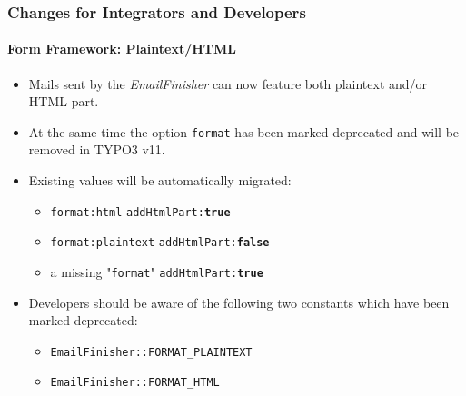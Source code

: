 
\begin{frame}[fragile]
	\frametitle{Changes for Integrators and Developers}
	\framesubtitle{Form Framework: Plaintext/HTML}

	\begin{itemize}
		\item Mails sent by the \textit{EmailFinisher} can now feature both plaintext and/or HTML part.

		\item At the same time the option \texttt{format} has been marked deprecated and will be removed in TYPO3 v11.

		\item Existing values will be automatically migrated:

			\begin{itemize}\smaller
				\item \texttt{format:html} \tabto{3cm}\textrightarrow\hspace{0.1cm}\texttt{addHtmlPart:\textbf{true}}
				\item \texttt{format:plaintext} \tabto{3cm}\textrightarrow\hspace{0.1cm}\texttt{addHtmlPart:\textbf{false}}
				\item a missing "\texttt{format}" \tabto{3cm}\textrightarrow\hspace{0.1cm}\texttt{addHtmlPart:\textbf{true}}
			\end{itemize}\normalsize

		\item Developers should be aware of the following two constants which have been marked deprecated:

			\begin{itemize}\smaller
				\item \texttt{EmailFinisher::FORMAT\_PLAINTEXT}
				\item \texttt{EmailFinisher::FORMAT\_HTML}
			\end{itemize}\normalsize

	\end{itemize}

\end{frame}


